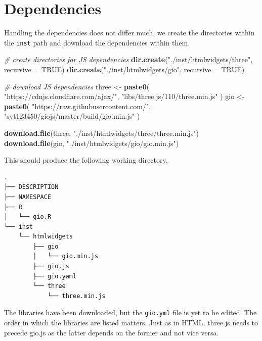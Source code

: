 \documentclass[
  10pt,
]{krantz}
\makeatletter
\newenvironment{Shaded}{\begin{snugshade}}{\end{snugshade}}
\newcommand{\CommentTok}[1]{\textcolor[rgb]{0.37,0.37,0.37}{\textit{#1}}}
\newcommand{\DataTypeTok}[1]{\textcolor[rgb]{0.27,0.27,0.27}{#1}}
\newcommand{\KeywordTok}[1]{\textcolor[rgb]{0.27,0.27,0.27}{\textbf{#1}}}
\newcommand{\NormalTok}[1]{#1}
\newcommand{\OtherTok}[1]{\textcolor[rgb]{0.37,0.37,0.37}{#1}}
\newcommand{\StringTok}[1]{\textcolor[rgb]{0.5,0.5,0.5}{#1}}
\newenvironment{kframe}{%
\medskip{}
\setlength{\fboxsep}{.8em}
 \def\at@end@of@kframe{}%
 \ifinner\ifhmode%
  \def\at@end@of@kframe{\end{minipage}}%
  \begin{minipage}{\columnwidth}%
 \fi\fi%
 \def\FrameCommand##1{\hskip\@totalleftmargin \hskip-\fboxsep
 \colorbox{shadecolor}{##1}\hskip-\fboxsep
     \hskip-\linewidth \hskip-\@totalleftmargin \hskip\columnwidth}%
 \MakeFramed {\advance\hsize-\width
   \@totalleftmargin\z@ \linewidth\hsize
   \@setminipage}}%
 {\par\unskip\endMakeFramed%
 \at@end@of@kframe}
\renewenvironment{Shaded}{\begin{kframe}}{\end{kframe}}
\makeatother
\begin{document}
\hypertarget{widgets-full-deps}{%
\section{Dependencies}\label{widgets-full-deps}}

Handling the dependencies does not differ much, we create the directories within the \texttt{inst} path and download the dependencies within them.

\begin{Shaded}
\begin{Highlighting}[]
\CommentTok{\# create directories for JS dependencies}
\KeywordTok{dir.create}\NormalTok{(}\StringTok{"./inst/htmlwidgets/three"}\NormalTok{, }\DataTypeTok{recursive =} \OtherTok{TRUE}\NormalTok{)}
\KeywordTok{dir.create}\NormalTok{(}\StringTok{"./inst/htmlwidgets/gio"}\NormalTok{, }\DataTypeTok{recursive =} \OtherTok{TRUE}\NormalTok{)}

\CommentTok{\# download JS dependencies}
\NormalTok{three <{-}}\StringTok{ }\KeywordTok{paste0}\NormalTok{(}
  \StringTok{"https://cdnjs.cloudflare.com/ajax/"}\NormalTok{,}
  \StringTok{"libs/three.js/110/three.min.js"}
\NormalTok{)}
\NormalTok{gio <{-}}\StringTok{ }\KeywordTok{paste0}\NormalTok{(}
  \StringTok{"https://raw.githubusercontent.com/"}\NormalTok{,}
  \StringTok{"syt123450/giojs/master/build/gio.min.js"}
\NormalTok{)}

\KeywordTok{download.file}\NormalTok{(three, }\StringTok{"./inst/htmlwidgets/three/three.min.js"}\NormalTok{)}
\KeywordTok{download.file}\NormalTok{(gio, }\StringTok{"./inst/htmlwidgets/gio/gio.min.js"}\NormalTok{)}
\end{Highlighting}
\end{Shaded}

This should produce the following working directory.

\begin{verbatim}
.
├── DESCRIPTION
├── NAMESPACE
├── R
│   └── gio.R
└── inst
    └── htmlwidgets
        ├── gio
        │   └── gio.min.js
        ├── gio.js
        ├── gio.yaml
        └── three
            └── three.min.js
\end{verbatim}

The libraries have been downloaded, but the \texttt{gio.yml} file is yet to be edited. The order in which the libraries are listed matters. Just as in HTML, three.js needs to precede gio.js as the latter depends on the former and not vice versa.
\end{document}
